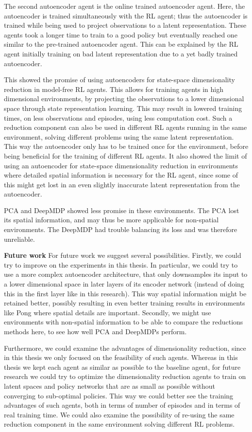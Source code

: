 The second autoencoder agent is the online trained autoencoder agent. Here, the autoencoder is trained simultaneously with the RL agent; thus the autoencoder is trained while being used to project observations to a latent representation. These agents took a longer time to train to a good policy but eventually reached one similar to the pre-trained autoencoder agent. This can be explained by the RL agent initially training on bad latent representation due to a yet badly trained autoencoder.

This showed the promise of using autoencoders for state-space dimensionality reduction in model-free RL agents. This allows for training agents in high dimensional environments, by projecting the observations to a lower dimensional space through state representation learning. This may result in lowered training times, on less observations and episodes, using less computation cost. Such a reduction component can also be used in different RL agents running in the same environment, solving different problems using the same latent representation. This way the autoencoder only has to be trained once for the environment, before being beneficial for the training of different RL agents. It also showed the limit of using an autoencoder for state-space dimensionality reduction in environments where detailed spatial information is necessary for the RL agent, since some of this might get lost in an even slightly inaccurate latent representation from the autoencoder.

PCA and DeepMDP showed less promise in these environments. The PCA lost its spatial information, and may thus be more applicable for non-spatial environments. The DeepMDP had trouble balancing its loss and was therefore unreliable.\newline

\noindent\textbf{Future work}\newline
\noindent For future work we suggest several possibilities. Firstly, we could try to improve on the experiments in this thesis. In particular, we could try to use a more complex autoencoder architecture, that only downsamples its input to a lower dimensional space in later layers of its encoder network (instead of doing this in the first layer like in this research). This way spatial information might be retained better, possibly resulting in even better training results in environments like Pong where spatial details are important. Secondly, we might use environments with non-spatial information to be able to compare the reductions methods here, to see how well PCA and DeepMDPs perform. 

Furthermore, we could examine the advantages of dimensionality reduction, since in this thesis we only focused on the feasibility of such agents. Whereas in this thesis we kept each agent as similar as possible to the baseline agent, for future research we could try to optimize the dimensionality reduction agents to train on latent spaces and policy networks that are as small as possible without converging to sub-optimal policies. This way we could better see the training advantages of such agents, both in terms of number of episodes and in terms of real training time. We could also examine the possibility of re-using the same reduction component in the same environment solving different RL problems.